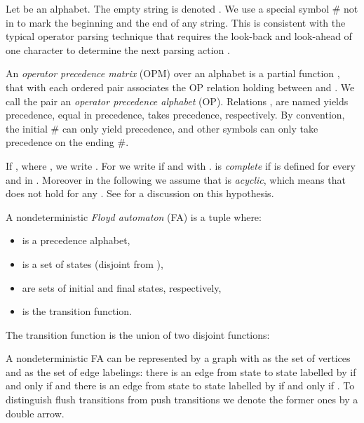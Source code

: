 \documentclass[10pt,a4paper,runningheads]{llncs}
\begin{document}
Let  be an alphabet. The empty string is denoted
. 
We use a special symbol \# not in  to mark the beginning and
the end of any string. This is consistent with the typical operator
parsing technique that requires the look-back and look-ahead of one
character to determine the next parsing action \cite{GruneJacobs:08}.




\begin{definition}\label{def:opm}
  An \textit{operator precedence matrix} (OPM)  over an alphabet
   is a partial function , that with each ordered pair 
  associates the OP relation  holding between  and .  We
  call the pair  an \emph{operator precedence alphabet}
  (OP).  Relations , are named
  yields precedence, equal in precedence, takes precedence,
  respectively.
By convention, the initial \# can only yield precedence, and other
symbols can only take precedence on the ending \#.
\end{definition}

\noindent 
If , where ,
we write .  For  we write  if
 and  with .
 is \emph{complete} if  is defined for every  and  in . 
Moreover in the following we assume that  is {\em acyclic}, which
means that  does
not hold for any . See
\cite{Crespi-ReghizziMM1978,Crespi-ReghizziM12,LMP10}
for a discussion on this hypothesis.




\begin{definition}\label{def:fa}
A nondeterministic \emph{Floyd automaton} (FA) is a tuple
 where:
\begin{itemize}
\item  is a precedence alphabet,
\item  is a set of states (disjoint from ),
\item  are sets of initial and final states, respectively, 
\item  is the transition function.
\end{itemize}
\end{definition}

\noindent The transition function is the union of two disjoint functions:

A nondeterministic FA can be represented by a graph
with  as the set of vertices and  as the set of edge
labelings: there is an edge from state  to state  labelled by
 if and only if  and there is
an edge from state  to state  labelled by  if and only
if .  To distinguish flush transitions from
push transitions we denote the former ones by a double arrow.
\end{document}
